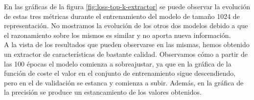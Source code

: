 \documentclass[../main.tex]{memoir}
\begin{document}
En las gráficas de la figura \ref{fig:loss-top-k-extractor} se puede
observar la evolución de estas tres métricas durante el entrenamiento
del modelo de tamaño 1024 de representación. No mostramos la evolución
de los otros dos modelos debido a que el razonamiento sobre los mismos
es similar y no aporta nueva información.\\

A la vista de los resultados que pueden observarse en las mismas,
hemos obtenido un extractor de características de bastante
calidad. Observamos cómo a partir de las 100 épocas el modelo comienza
a sobreajustar, ya que en la gráfica de la función de coste el valor
en el conjunto de entrenamiento sigue descendiendo, pero en el de
validación se estanca y comienza a subir. Además, en la gráfica de la
precisión se produce un estancamiento de los valores obtenidos.\\
\end{document}
